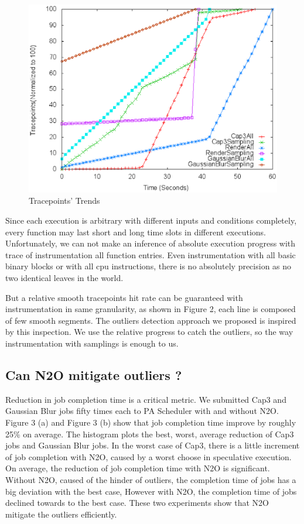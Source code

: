 \begin{figure}
\centering
\includegraphics[width=0.62\columnwidth]{figures/tracepoints_all_vs_sampling.eps}
\caption{Tracepoints' Trends}
\label{figure:tracepoints}
\end{figure}

Since each execution is arbitrary with different inputs and conditions completely, every function may last short and long time slots in different executions. Unfortunately, we can not make an inference of absolute execution progress with  trace of instrumentation all function entries. Even instrumentation with all basic binary blocks or with all cpu instructions, there is no absolutely precision as no two identical leaves in the world. 

But a relative smooth tracepoints hit rate can be guaranteed with instrumentation in same granularity, as shown in Figure 2, each line is composed  of few smooth segments. The outliers detection approach we proposed is inspired by this inspection. We use the relative progress to catch the outliers, so the way instrumentation with samplings is enough to us.

\subsection{Can N2O mitigate outliers ?}

Reduction in job completion time is a critical metric. We submitted Cap3 and Gaussian Blur jobs fifty times each to PA Scheduler with and without N2O. Figure 3 (a) and Figure 3 (b) show that job completion time improve by roughly 25\% on average. The histogram plots the best, worst, average reduction of Cap3 jobs and Gaussian Blur jobs. In the worst case of Cap3, there is a little increment of job completion with N2O, caused by a worst choose in speculative execution. On average, the reduction of job completion time with N2O is significant. Without N2O, caused of the hinder of outliers, the completion time of jobs has a big deviation with the best case, However with N2O, the completion time of jobs declined towards to the best case. These two experiments show that N2O mitigate the outliers efficiently.

